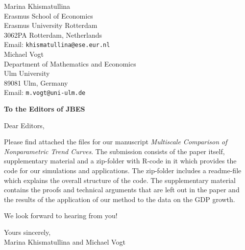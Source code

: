 \documentclass[12pt,a4paper]{letter}
\begin{document}
\pagestyle{empty}



Marina Khismatullina \\
Erasmus School of Economics \\ 
Erasmus University Rotterdam \\
3062PA Rotterdam, Netherlands \\ 
Email: \texttt{khismatullina@ese.eur.nl} \\[1pt]

Michael Vogt \\
Department of Mathematics and Economics\\
Ulm University \\
89081 Ulm, Germany \\
Email: \texttt{m.vogt@uni-ulm.de} 

\vspace{35pt}


\textbf{To the Editors of JBES}
\vspace{20pt}


Dear Editors,
\vspace{7pt}

Please find attached the files for our manuscript \textit{Multiscale Comparison of Nonparametric Trend Curves}. The submission consists of the paper itself, supplementary material and a zip-folder with R-code in it which provides the code for our simulations and applications. The zip-folder includes a readme-file which explains the overall structure of the code. The supplementary material contains the proofs and technical arguments that are left out in the paper and the results of the application of our method to the data on the GDP growth.

We look forward to hearing from you!
\vspace{35pt}

Yours sincerely, \\
Marina Khismatullina and Michael Vogt 
\end{document}

